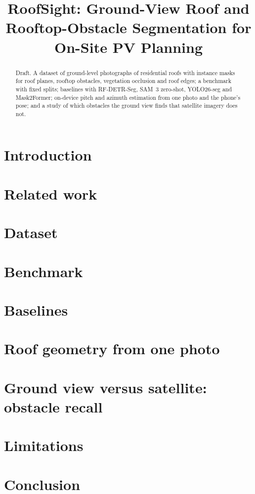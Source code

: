 \documentclass[11pt]{article}
\title{RoofSight: Ground-View Roof and Rooftop-Obstacle Segmentation for On-Site PV Planning}
\author{}
\date{}
\begin{document}
\maketitle

\begin{abstract}
Draft. A dataset of ground-level photographs of residential roofs with instance masks for roof
planes, rooftop obstacles, vegetation occlusion and roof edges; a benchmark with fixed splits;
baselines with RF-DETR-Seg, SAM~3 zero-shot, YOLO26-seg and Mask2Former; on-device pitch and
azimuth estimation from one photo and the phone's pose; and a study of which obstacles the
ground view finds that satellite imagery does not.
\end{abstract}

\section{Introduction}
\section{Related work}
\section{Dataset}
\section{Benchmark}
\section{Baselines}

\section{Roof geometry from one photo}
\section{Ground view versus satellite: obstacle recall}
\section{Limitations}
\section{Conclusion}
\end{document}
